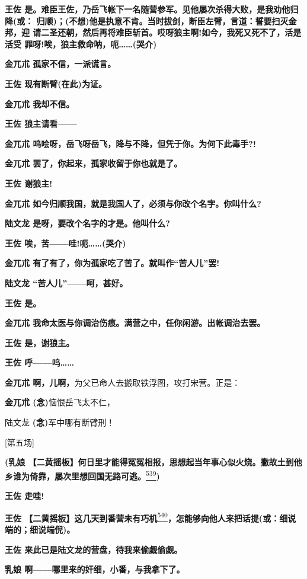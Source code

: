 \textbf{王佐
是。难臣王佐，乃岳飞帐下一名随营参军。见他屡次杀得大败，是我劝他归降(或：
归顺)；(不想)他是执意不肯。当时拔剑，断臣左臂，言道：誓要扫灭金邦，迎
请二圣还朝，然后再将难臣斩首。哎呀狼主啊!如今，我死又死不了，活是活受
罪呀!唉，狼主救命呐，呃\ldots{}\ldots{}(哭介)}

\textbf{金兀朮 孤家不信，一派谎言。}

\textbf{王佐 现有断臂(在此)为证。}

\textbf{金兀朮 我却不信。}

\textbf{王佐 狼主请看------}

\textbf{金兀朮 呜哙呀，岳飞呀岳飞，降与不降，但凭于你。为何下此毒手?!}

\textbf{金兀朮 罢了，你起来，孤家收留于你也就是了。}

\textbf{王佐 谢狼主!}

\textbf{金兀朮 如今归顺我国，就是我国人了，必须与你改个名字。你叫什么?}

\textbf{陆文龙 是呀，要改个名字的才是。他叫什么?}

\textbf{王佐 唉，苦------哇!呃\ldots{}\ldots{}(哭介)}

\textbf{金兀朮 有了有了，你为孤家吃了苦了。就叫作``苦人儿''罢!}

\textbf{陆文龙 ``苦人儿''------呵，甚好。}

\textbf{王佐 是。}

\textbf{金兀朮 我命太医与你调治伤痕。满营之中，任你闲游。出帐调治去罢。}

\textbf{王佐 是，谢狼主。}

\textbf{王佐 呼------呜\ldots{}\ldots{}}

\textbf{金兀朮 啊，儿啊，}为父已命人去搬取铁浮图，攻打宋营。正是：

\textbf{金兀朮 (念)}恼恨岳飞太不仁，

陆文龙 \textbf{(念)}军中哪有断臂刑！

{[}第五场{]}

\textbf{(乳娘
【二黄摇板】何日里才能得冤冤相报，思想起当年事心似火烧。撇故土到他乡谁为倚靠，屡次里想回国无路可逃。}\protect\hyperlink{fn539}{\textsuperscript{539}}\textbf{)}

\textbf{王佐 走哇!}

\textbf{王佐
【二黄摇板】这几天到番营未有巧机}\protect\hyperlink{fn540}{\textsuperscript{540}}\textbf{，怎能够向他人来把话提(或：细说端的；细说端倪)。}

\textbf{王佐 来此已是陆文龙的营盘，待我来偷觑偷觑。}

\textbf{乳娘 啊------哪里来的奸细，小番，与我拿下了。}


